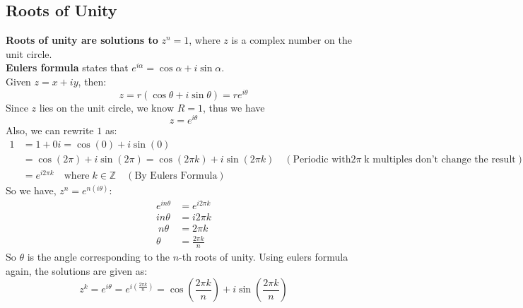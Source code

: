 \documentclass[a4paper, 10pt]{article}
\begin{document}
\subsection{Roots of Unity}
\textbf{Roots of unity are solutions to} $z^n = 1$, where $z$ is a complex number on the unit circle.\\
\textbf{Eulers formula} states that $e^{i\alpha} = \cos\alpha + i\sin\alpha$. \\
Given $z = x+ iy$, then:
$$z = r(\cos\theta + i\sin\theta) = re^{i\theta}$$
Since $z$ lies on the unit circle, we know $R =1$, thus we have
$$z = e^{i\theta}$$
Also, we can rewrite $1$ as:
\begin{align*}
  1 & = 1 + 0i = \cos(0) + i\sin(0)                                                                                                             \\
    & = \cos(2\pi) + i\sin(2\pi) = \cos(2\pi k) + i\sin(2\pi k) \quad (\text{Periodic with} 2\pi \; \text{k multiples don't change the result}) \\
    & = e^{i2\pi k} \quad \text{where} \; k \in \mathbb{Z} \quad (\text{By Eulers Formula})
\end{align*}
So we have, $z^n = e^{n(i \theta)}$:
\begin{align*}
  e^{in\theta} & = e^{i2\pi k}      \\
  in\theta     & = i 2\pi k         \\\
  n\theta      & = 2\pi k           \\
  \theta       & = \frac{2\pi k}{n}
\end{align*}
So $\theta$ is the angle corresponding to the $n$-th roots of unity. Using eulers formula again, the solutions are given as:
$$z^k = e^{i\theta} = e^{i(\frac{2\pi k}{n})} = \cos\left(\frac{2\pi k}{n}\right) + i \sin\left(\frac{2\pi k}{n}\right)$$
\end{document}
